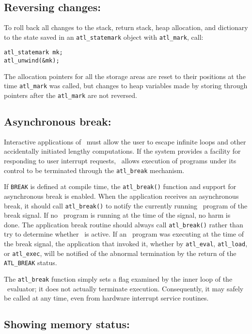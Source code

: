 \documentclass[twocolumn]{article}
\begin{document}
\subsection{Reversing changes: }

To roll back all changes to the stack, return stack, heap allocation,
and dictionary to the state saved in an \verb+atl_statemark+ object
with \verb+atl_mark+, call:

{\tt \verb+atl_statemark+ mk;\\
\verb+atl_unwind(&mk);+}

The allocation pointers for all the storage areas are reset to their
positions at the time \verb+atl_mark+ was called, but changes to
heap variables made by storing through pointers after the
\verb+atl_mark+ are not reversed.

\subsection{Asynchronous break: }

Interactive applications of \atlast\ must allow the user
to escape infinite loops and other accidentally initiated lengthy
computations.  If the system provides a facility for responding to
user interrupt requests, \atlast\ allows execution of programs under
its control to be terminated through the \verb+atl_break+ mechanism.

If {\tt BREAK} is defined at compile time, the \verb+atl_break()+
function and support for asynchronous break is enabled.  When the
application receives an asynchronous break, it should call
\verb+atl_break()+ to notify the currently running \atlast\ program of
the break signal.  If no \atlast\ program is running at the time of the
signal, no harm is done.  The application break routine should always
call \verb+atl_break()+ rather than try to determine whether \atlast\
is active.  If an \atlast\ program was executing at the time of the
break signal, the application that invoked it, whether by
\verb+atl_eval+, \verb+atl_load+, or \verb+atl_exec+, will be notified
of the abnormal termination by the return of the \verb+ATL_BREAK+
status.

The \verb+atl_break+ function simply sets a flag examined by the inner
loop of the \atlast\ evaluator; it does not actually terminate
execution.  Consequently, it may safely be called at any time, even
from hardware interrupt service routines.

\subsection{Showing memory status: }
\end{document}

